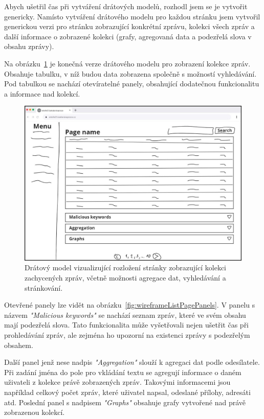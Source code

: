     Abych ušetřil čas při vytváření drátových modelů, rozhodl jsem se je vytvořit genericky. Namísto vytváření drátového modelu pro každou stránku jsem vytvořil generickou verzi pro stránku zobrazující konkrétní zprávu, kolekci všech zpráv a další informace o zobrazené kolekci (grafy, agregovaná data a podezřelá slova v obsahu zprávy).


    Na obrázku~\ref{fig:wireframeListPage} je konečná verze drátového modelu pro zobrazení kolekce zpráv. Obsahuje tabulku, v níž budou data zobrazena společně s možností vyhledávání. Pod tabulkou se nachází otevíratelné panely, obsahující dodatečnou funkcionalitu a informace nad kolekcí.
    \begin{figure}[H]
        \centering
        \includegraphics[scale=0.25]{obrazky-figures/NavrhUXUI/ListPage.jpg}
        \caption{Drátový model vizualizující rozložení stránky zobrazující kolekci zachycených zpráv, včetně možnosti agregace dat, vyhledávání a stránkování.}
        \label{fig:wireframeListPage}
    \end{figure}

    Otevřené panely lze vidět na obrázku~\ref{fig:wireframeListPagePanels}. V panelu s názvem \textit{"Malicious keywords"} se nachází seznam zpráv, které ve svém obsahu mají podezřelá slova. Tato funkcionalita může vyšetřovali nejen ušetřit čas při prohledávání zpráv, ale zejména ho upozorní na existenci zprávy s podezřelým obsahem.

    Další panel jenž nese nadpis \textit{"Aggregation"} slouží k agregaci dat podle odesílatele. Při zadání jména do pole pro vkládání textu se agregují informace o daném uživateli z kolekce právě zobrazených zpráv. Takovými informacemi jsou například celkový počet zpráv, které uživatel napsal, odeslané přílohy, adresáti atd. Poslední panel s nadpisem \textit{"Graphs"} obsahuje grafy vytvořené nad právě zobrazenou kolekcí.

